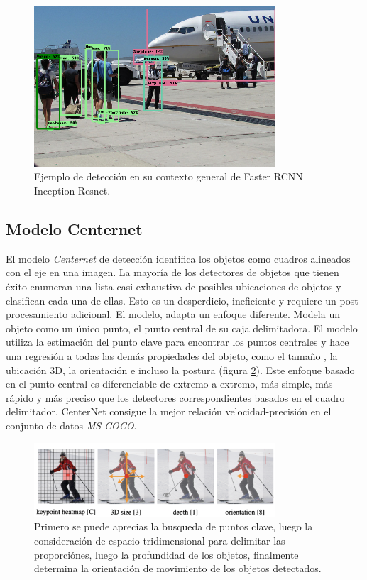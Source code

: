 \documentclass[letter,12pt]{report}
\begin{document}
\begin{figure}[ht]
    \centering
    \includegraphics[width=0.8\textwidth]{resnet}
    \caption{Ejemplo de detección en su contexto general de Faster RCNN Inception Resnet.}
    \label{fig:resnet}
\end{figure}

\subsection{Modelo Centernet}

El modelo \textit{Centernet} \cite{zhou2019objects} de detección identifica los objetos como
cuadros alineados con el eje en una imagen. La mayoría de los detectores de objetos que tienen
éxito enumeran una lista casi exhaustiva de posibles ubicaciones de objetos y clasifican cada
una de ellas. Esto es un desperdicio, ineficiente y requiere un post-procesamiento adicional.
El modelo, adapta un enfoque diferente. Modela un objeto como un único punto, el punto central
de su caja delimitadora. El modelo utiliza la estimación del punto clave para encontrar los
puntos centrales y hace una regresión a todas las demás propiedades del objeto, como el tamaño
, la ubicación 3D, la orientación e incluso la postura (figura \ref{fig:3dspace}). Este
enfoque basado en el punto central es diferenciable de extremo a extremo, más simple, más
rápido y más preciso que los detectores correspondientes basados en el cuadro delimitador.
CenterNet consigue la mejor relación velocidad-precisión en el conjunto de datos
\textit{MS COCO}.

\begin{figure}[ht]
    \centering
    \includegraphics[width=0.8\textwidth]{3dspace}
    \caption{Primero se puede aprecias la busqueda de puntos clave, luego la consideración
    de espacio tridimensional para delimitar las proporciónes, luego la profundidad de los
    objetos, finalmente determina la orientación de movimiento de los objetos detectados.}
    \label{fig:3dspace}
\end{figure}
\end{document}
